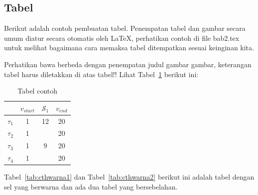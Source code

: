 
\subsection{Tabel}  
Berikut adalah contoh pembuatan tabel. 
Penempatan tabel dan gambar secara umum diatur secara otomatis oleh \LaTeX{}, perhatikan contoh di file bab2.tex untuk melihat bagaimana cara memaksa tabel ditempatkan sesuai keinginan kita.

Perhatikan bawa berbeda dengan penempatan judul gambar gambar, keterangan tabel harus diletakkan di atas tabel!!
Lihat Tabel~\ref{tab:contoh1} berikut ini:

\begin{table}[H] %
	\centering 
	\caption{Tabel contoh}
	\label{tab:contoh1}
	\begin{tabular}{cccc}
		\toprule
		& $v_{start}$ & $\mathcal{S}_{1}$ & $v_{end}$\\

		\midrule
		$\tau_{1}$ & 1 & 12& 20\\
		$\tau_{2}$ & 1 &  & 20\\
		$\tau_{3}$ & 1 & 9 & 20\\
		$\tau_{4}$ & 1 &  & 20\\

		\bottomrule
		
	\end{tabular} 
\end{table}
Tabel~\ref{tab:cthwarna1} dan Tabel~\ref{tab:cthwarna2} berikut ini adalah tabel dengan sel yang berwarna dan ada dua tabel yang bersebelahan. 
